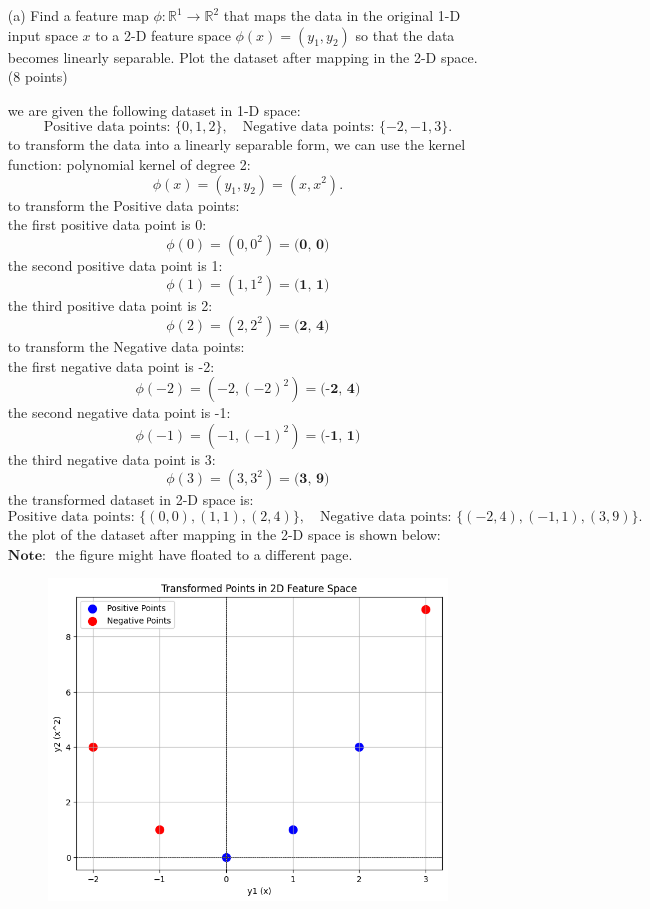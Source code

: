 \documentclass[a3paper,12pt]{article} %
\begin{document}
\begin{enumerate}
    \item[(a)] Find a feature map $\phi : \mathbb{R}^1 \to \mathbb{R}^2$ that maps the data in the original 1-D input space $x$ to a 2-D feature space $\phi(x) = (y_1, y_2)$ so that the data becomes linearly separable. Plot the dataset after mapping in the 2-D space. \hfill (8 points)
   
    we are given the following dataset in 1-D space:
    \[
    \text{Positive data points: } \{0, 1, 2\}, \quad \text{Negative data points: } \{-2, -1, 3\}.
    \]
    to transform the data into a linearly separable form, we can use the kernel function: polynomial kernel of degree 2:
    \[
    \phi(x) = (y_1, y_2) = (x, x^2).
    \]
    to transform the Positive data points:
    \\ the first positive data point is 0:
    \[
    \phi(0) = (0, 0^2) = \textbf{(0, 0)}
    \]
    the second positive data point is 1:
    \[
    \phi(1) = (1, 1^2) = \textbf{(1, 1)}
    \]
    the third positive data point is 2:
    \[
    \phi(2) = (2, 2^2) = \textbf{(2, 4)}
    \]
    to transform the Negative data points:
    \\ the first negative data point is -2:
    \[
    \phi(-2) = (-2, (-2)^2) = \textbf{(-2, 4)}
    \]
    the second negative data point is -1:
    \[
    \phi(-1) = (-1, (-1)^2) = \textbf{(-1, 1)}
    \]
    the third negative data point is 3:
    \[
    \phi(3) = (3, 3^2) = \textbf{(3, 9)}
    \]
    the transformed dataset in 2-D space is:
    \[
    \text{Positive data points: } \{(0, 0), (1, 1), (2, 4)\}, \quad \text{Negative data points: } \{(-2, 4), (-1, 1), (3, 9)\}.
    \]
    the plot of the dataset after mapping in the 2-D space is shown below:
   \(\textbf{Note: }\)  the figure might have floated to a different page.
    \begin{figure}[h!]
        \centering
        \includegraphics[width=0.5\linewidth]{2D_space.png}
    \label{fig:2D space}
    \end{figure}
    



\end{enumerate}
\end{document}
